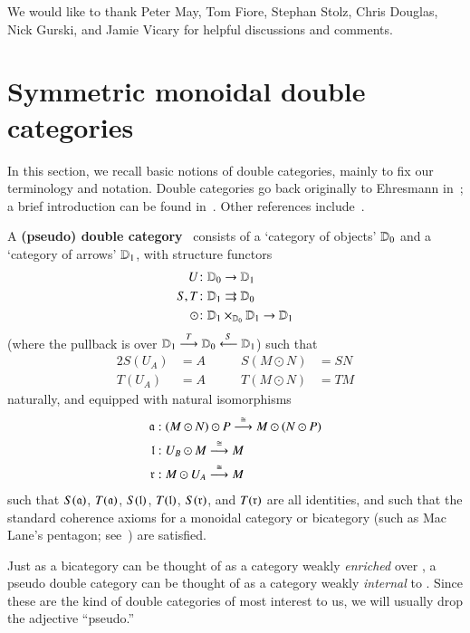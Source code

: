 \documentclass{amsart}
\begin{document}
We would like to thank Peter May, Tom Fiore, Stephan Stolz, Chris
Douglas, Nick Gurski, and Jamie Vicary for helpful discussions and comments.


\section{Symmetric monoidal double categories}
\label{sec:symm-mono-double}

In this section, we recall basic notions of double categories, mainly to fix our terminology and notation.
Double categories go back originally to Ehresmann
in~\cite{ehresmann:cat-str}; a brief introduction can be found
in~\cite{ks:r2cats}.  Other references
include~\cite{multi_funct_i,gp:double-limits,gp:double-adjoints}.


\begin{defn}
  A \textbf{(pseudo) double category} \lD\ consists of a `category of
  objects' $\lD_0$ and a `category of arrows' $\lD_1$, with structure
  functors
  \begin{align*}
    U&\maps \lD_0\to \lD_1\\
    S,T&\maps \lD_1\rightrightarrows \lD_0\\
    \odot&\maps \lD_1\times_{\lD_0}\lD_1\to \lD_1
  \end{align*}
  (where the pullback is over
  $\lD_1\too[T]\lD_0\overset{S}{\longleftarrow} \lD_1$) such that
  \begin{alignat*}{2}
    S(U_A) &= A &\qquad
    S(M\odot N) &= SN\\
    T(U_A) &= A &\qquad
    T(M\odot N) &= TM
  \end{alignat*}
  naturally, and equipped with natural isomorphisms
  \begin{align*}
    \fa &: (M\odot N) \odot P \too[\iso] M \odot (N \odot P)\\
    \fl &: U_B \odot M \too[\iso] M\\
    \fr &: M \odot U_A \too[\iso] M
  \end{align*}
  such that $S(\fa)$, $T(\fa)$, $S(\fl)$, $T(\fl)$, $S(\fr)$, and
  $T(\fr)$ are all identities, and such that the standard coherence
  axioms for a monoidal category or bicategory (such as Mac Lane's
  pentagon; see~\cite{maclane}) are satisfied.
\end{defn}

Just as a bicategory can be thought of as a category weakly
\emph{enriched} over \cCat, a pseudo double category can be thought of
as a category weakly \emph{internal} to \cCat.  Since these are the
kind of double categories of most interest to us, we will usually drop
the adjective ``pseudo.''
\end{document}
